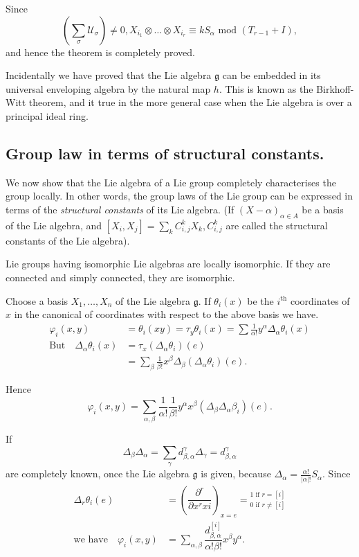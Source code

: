 Since 
$$
(\sum\limits_\sigma \mathcal{U}_\sigma) \ne 0, X_{i_1} \otimes \ldots
\otimes X_{i_r} \equiv k S_\alpha \text{ mod } (T_{r-1}+I), 
$$
and hence the theorem is completely proved.

Incidentally we have proved that the Lie algebra $\mathfrak{g}$ can be
embedded in its universal enveloping algebra by the natural map
$h$. This is known as the Birkhoff-Witt theorem,  and it true in the
more general case when the Lie algebra is over a principal ideal
ring. 

\subsection{Group law in terms of structural
  constants.}\label{chap4-sec4.3}%

We now show that the Lie algebra of a Lie group completely
characterises the group locally.  In other words, the group laws of the
Lie group  can be expressed in terms of the \textit{structural
  constants} of its Lie algebra. (If $(X-\alpha)_{\alpha \in A}$ be a
basis of the Lie algebra,  and $[X_i,X_j]=\sum_{k}
C^k_{i,j}X_k,C^k_{i,j}$  are called the structural constants of the
Lie algebra). 

\begin{thm}\label{chap4-thm2}%
{Lie groups having isomorphic Lie algebras are locally isomorphic. If
  they are connected and simply connected, they are isomorphic}. 
\end{thm}

Choose a basis $X_1, \ldots , X_n$ of the Lie algebra
$\mathfrak{g}$. If $\theta_i(x)$ be the $i^{\text{th}}$ coordinates of $x$ in
the canonical of coordinates with respect  to the above basis  we
have. 
\begin{align*}
\varphi_i(x,y)& =\theta_i(xy)=\tau_y \theta_i(x)= \sum \frac{1}{\alpha
  !}y^\alpha\Delta_\alpha\theta_i(x)\\ 
\text{But~~ } \Delta_\alpha\theta_i(x) &=
\tau_x(\Delta_\alpha\theta_i)(e)\\ 
&=\sum\limits_{\beta} \frac{1}{\beta !}x^\beta \Delta_\beta
(\Delta_\alpha\theta_i)(e). 
\end{align*}

Hence\pageoriginale     
$$
\varphi_i(x,y)  = \sum\limits_{\alpha ,\beta} \dfrac{1}{\alpha !}
\dfrac {1}{\beta !} y^\alpha x^\beta (\Delta _\beta \Delta _\alpha
\beta_i ) (e). 
$$

If 
$$ 
\Delta_\beta \Delta_\alpha  = \sum_\gamma d^\gamma_{\beta,\alpha}
\Delta_\gamma = d_{\beta,\alpha}^\gamma
$$ 
are completely known, once the Lie algebra $\mathfrak{g}$ is given, because
$\Delta_\alpha =\frac{\alpha!}{|\alpha|!}S_\alpha$. Since
\begin{align*}
\Delta_r \theta_i (e) & =(\dfrac{\partial^r}{\partial x^r xi})_{x=e}  =
      {^{1  \text{ if } r= [i]}_{0 \text{ if } r \neq [i]}}\\ 
\text{we have~~ } \varphi_i(x,y)&  = \sum_{\alpha, \beta}
\dfrac{d^{[i]}_{\beta , \alpha}}{\alpha! \beta!}x^\beta
y^\alpha.
\end{align*}

